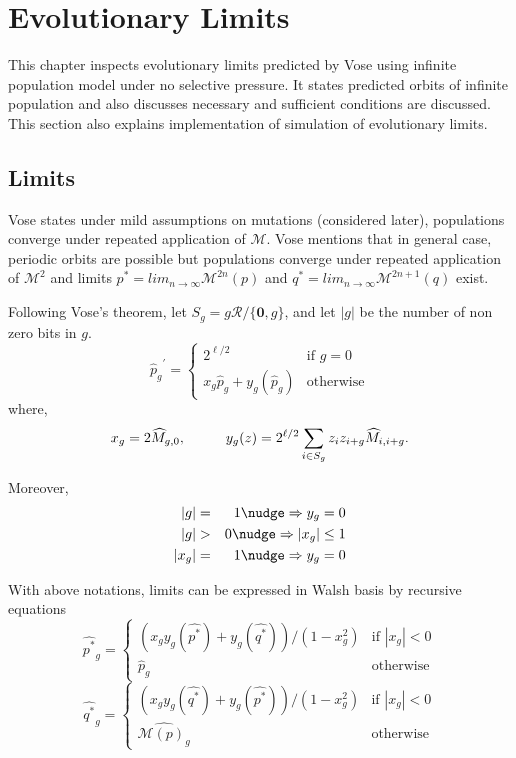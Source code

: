 \chapter{Evolutionary Limits} \label{ch:evolutionary limits}
This chapter inspects evolutionary limits predicted by Vose using infinite population model under no selective pressure. It states predicted orbits of infinite population and also discusses necessary and sufficient conditions are discussed. This section also explains implementation of simulation of evolutionary limits.

\section{Limits}
\label{Limits}
Vose states under mild assumptions on mutations (considered later), populations converge under repeated application of $\mathcal{M}$. Vose mentions that in general case, periodic orbits are possible but populations converge under repeated application of $\mathcal{M}^2$ and limits $p^\ast = lim_{n \rightarrow \infty} \mathcal{M}^{2n}(p)$ and $q^\ast = lim_{n \rightarrow \infty} \mathcal{M}^{2n+1}(q)$ exist.

Following Vose's theorem, let $S_g = g \mathcal{R} / \{\textbf{0}, g\}$, and let $|g|$ be the number of non zero bits in $g$.
\[
{{\widehat{p}}_g}^{\prime}  = \begin{cases}
    2^{\ell /2}  & \text{if $g = 0$}\\
    x_g \widehat{p}_g + y_g(\widehat{p}_g) & \text{otherwise}
  \end{cases}
\]
where,
\[
x_g = 2\widehat{M}_{g,0},  \hspace*{1cm} y_g(z) = 2^{\ell /2} \sum_{i \in S_g} z_i z_{i+g} \widehat{M}_{i,i+g}.
\]

Moreover, 
\begin{eqnarray*}
|g| & = & 1 \nudge \Rightarrow y_g = 0 \\
|g| & > & 0 \nudge \Rightarrow |x_g| \leq 1 \\
|x_g| & = & 1 \nudge \Rightarrow y_g = 0
\end{eqnarray*}

With above notations, limits can be expressed in Walsh basis by recursive equations 
\begin{equation}
\label{lt1}
\widehat{p^{\ast}}_g  = \begin{cases}
    (x_g y_g(\widehat{p^{\ast}}) + y_g(\widehat{q^{\ast}}))/(1-x_g^2)  & \text{if $|x_g| < 0$}\\
    \widehat{p}_g  & \text{otherwise}
  \end{cases}
\end{equation}
\begin{equation}
\label{lt2}
\widehat{q^{\ast}}_g  = \begin{cases}
    (x_g y_g(\widehat{q^{\ast}}) + y_g(\widehat{p^{\ast}}))/(1-x_g^2)  & \text{if $|x_g| < 0$}\\
    \widehat{\mathcal{M}(p)_g}  & \text{otherwise}
  \end{cases}
\end{equation}

